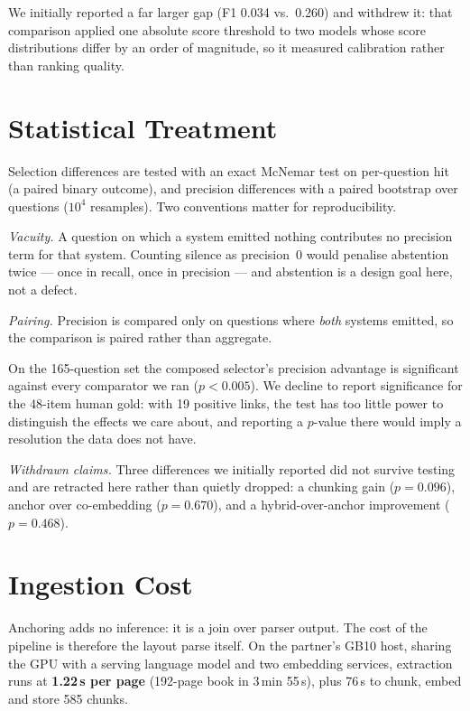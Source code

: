 \documentclass[journal]{IEEEtran}
\begin{document}
We initially reported a far larger gap (F1 0.034 vs.\ 0.260) and withdrew it: that
comparison applied one absolute score threshold to two models whose score
distributions differ by an order of magnitude, so it measured calibration rather
than ranking quality.


\section{Statistical Treatment}

Selection differences are tested with an exact McNemar test on per-question hit
(a paired binary outcome), and precision differences with a paired bootstrap over
questions ($10^4$ resamples). Two conventions matter for reproducibility.

\emph{Vacuity.} A question on which a system emitted nothing contributes no
precision term for that system. Counting silence as precision~0 would penalise
abstention twice --- once in recall, once in precision --- and abstention is a
design goal here, not a defect.

\emph{Pairing.} Precision is compared only on questions where \emph{both} systems
emitted, so the comparison is paired rather than aggregate.

On the 165-question set the composed selector's precision advantage is significant
against every comparator we ran ($p < 0.005$). We decline to report significance
for the 48-item human gold: with 19 positive links, the test has too little power
to distinguish the effects we care about, and reporting a $p$-value there would
imply a resolution the data does not have.

\emph{Withdrawn claims.} Three differences we initially reported did not survive
testing and are retracted here rather than quietly dropped: a chunking gain
($p = 0.096$), anchor over co-embedding ($p = 0.670$), and a hybrid-over-anchor
improvement ($p = 0.468$).


\section{Ingestion Cost}

Anchoring adds no inference: it is a join over parser output. The cost of the
pipeline is therefore the layout parse itself. On the partner's GB10 host, sharing
the GPU with a serving language model and two embedding services, extraction runs
at \textbf{1.22\,s per page} (192-page book in 3\,min 55\,s), plus 76\,s to chunk,
embed and store 585 chunks.
\end{document}
